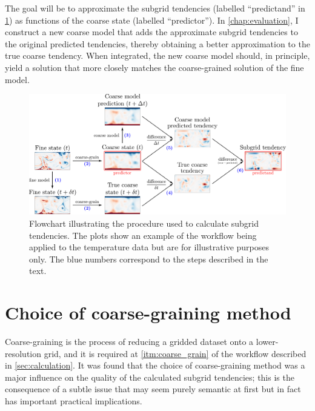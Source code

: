 \documentclass[../main.tex]{subfiles}
\begin{document}
The goal will be to approximate the subgrid tendencies (labelled
``predictand'' in \cref{fig:method}) as functions of the coarse state (labelled
``predictor''). In \cref{chap:evaluation}, I construct a new coarse model
that adds the approximate subgrid tendencies to the original predicted
tendencies, thereby obtaining a better approximation to the true coarse
tendency. When integrated, the new coarse model should, in principle,
yield a solution that more closely matches the coarse-grained solution of
the fine model.

\begin{figure}[ht]
    \centering
    \includegraphics[width=\linewidth]{figures/method_v2.pdf}
    \caption{
        Flowchart illustrating the procedure used to calculate subgrid
        tendencies. The plots show an example of the workflow being applied to
        the temperature data but are for illustrative purposes only. The blue
        numbers correspond to the steps described in the text.
    }
    \label{fig:method}
\end{figure}


\section{Choice of coarse-graining method} \label{sec:coarse_graining}
Coarse-graining is the process of reducing a gridded dataset onto a
lower-resolution grid, and it is required at \cref{itm:coarse_grain} of the
workflow described in \cref{sec:calculation}. It was found that the choice of
coarse-graining method was a major influence on the quality of the calculated
subgrid tendencies; this is the consequence of a subtle issue that may seem
purely semantic at first but in fact has important practical implications.
\end{document}
